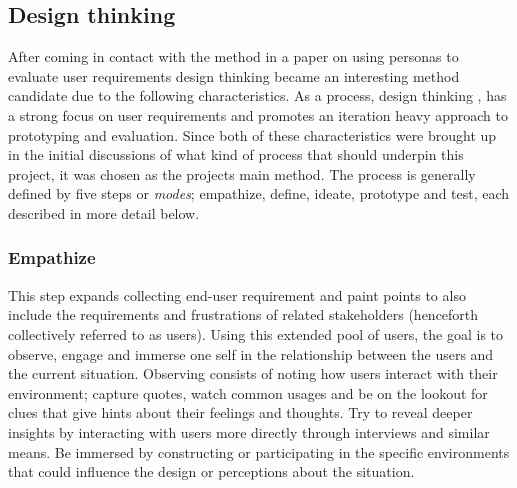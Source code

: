 \documentclass[a4paper,11pt]{article}
\newcounter{counterTODO}\setcounter{counterTODO}{1}
\newcommand\TODO[2][]{%
  \ifshowTodo{%
    \def\varTODOtext{\textcolor{purple}{\texttt{<}\textbf{TODO}\#\arabic{counterTODO}\texttt{: #2>}}}
    \def\varTODOContentLine{\textcolor{purple}{#2}}
    \ifthenelse{\isempty{#1}}%
      {%
        \addcontentsline{tocTODO}{section}{\vspace{-0.3cm}\varTODOContentLine}%
        \varTODOtext\\%
      }%
      {%
        \addcontentsline{tocTODO}{section}{\vspace{-0.3cm}\sout{\varTODOContentLine}}%
      }%
      \stepcounter{counterTODO}%
  }\fi%
}
\newif\ifshowTodo
\begin{document}
  \TODO[]{Finish Methodology}

  \subsection{Design thinking}

    After coming in
    contact with the method in a paper on using personas to evaluate user
    requirements\cite{c_personas_article_controlled_experiment} design thinking
    became an interesting method candidate due to the following characteristics.
    As a process, design thinking%
      \cite{c_design_thinking_article_origins,
      c_design_thinking_online_nonpeer_dschool_stanford},
    has a strong focus on user requirements and
    promotes an iteration heavy approach to prototyping and evaluation. Since
    both of these characteristics were brought up in the initial discussions of
    what kind of process that should underpin this project, it was chosen as the
    projects main method. The process is generally defined by five steps or
    \textit{modes}; empathize, define, ideate, prototype and test, each
    described in more detail below.


    \subsubsection{Empathize}

      This step expands collecting end-user requirement and paint points
      to also include the requirements and frustrations of related stakeholders
      (henceforth collectively referred to as users).
      Using this extended pool of users, the goal is to observe, engage and
      immerse one self in the relationship between the users and the current
      situation. Observing consists of noting how users interact with their
      environment; capture quotes, watch common usages and be on the lookout for
      clues that give hints about their feelings and thoughts. Try to reveal
      deeper insights by interacting with users more directly through
      interviews and similar means. Be immersed by constructing or participating
      in the specific environments that could influence the design or
      perceptions about the situation. \\
\end{document}
